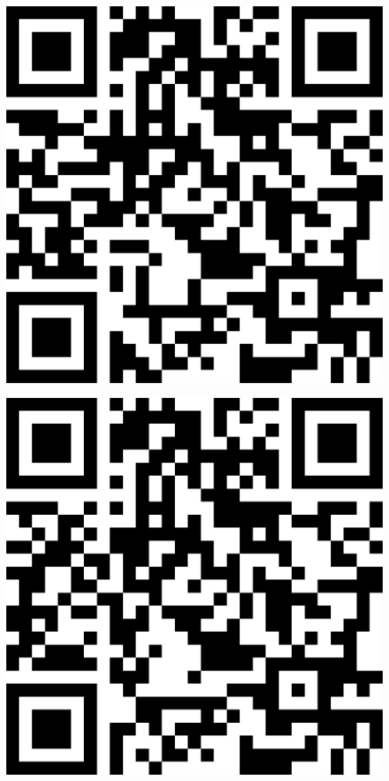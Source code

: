\documentclass[letterpaper]{article}
\begin{document}
 \endgroup 
 \vspace*{\fill} 
 \pagebreak 
{} 
 \vspace*{\fill} 
 \begingroup 
 \centerline{\includegraphics[scale=1,width=5in,height=5in]{Office3651.png}} 
 \endgroup 
 \vspace*{\fill} 
 \pagebreak 
{} 
 \vspace*{\fill} 
 \begingroup 
 \centerline{\includegraphics[scale=1,width=5in,height=5in]{Office3655.png}} 
\end{document}
